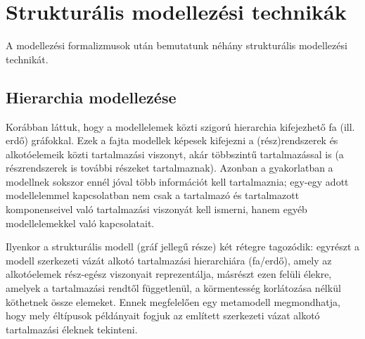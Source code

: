 
\section{Strukturális modellezési technikák}

%
%
%

A modellezési formalizmusok után bemutatunk néhány strukturális modellezési technikát.

\subsection{Hierarchia modellezése}

Korábban láttuk, hogy a modellelemek közti szigorú hierarchia kifejezhető fa (ill. erdő) gráfokkal. Ezek a fajta modellek képesek kifejezni a (rész)rendszerek és alkotóelemeik közti tartalmazási viszonyt, akár többszintű tartalmazással is (a részrendszerek is további részeket tartalmaznak). Azonban a gyakorlatban a modellnek sokszor ennél jóval több információt kell tartalmaznia; egy-egy adott modellelemmel kapcsolatban nem csak a tartalmazó és tartalmazott komponenseivel való tartalmazási viszonyát kell ismerni, hanem egyéb modellelemekkel való kapcsolatait.

Ilyenkor a strukturális modell (gráf jellegű része) két rétegre tagozódik: egyrészt a modell szerkezeti vázát alkotó tartalmazási hierarchiára (fa/erdő), amely az alkotóelemek rész-egész viszonyait reprezentálja, másrészt ezen felüli  élekre, amelyek a tartalmazási rendtől függetlenül, a körmentesség korlátozása nélkül köthetnek össze elemeket. Ennek megfelelően egy metamodell megmondhatja, hogy mely éltípusok példányait fogjuk az említett szerkezeti vázat alkotó tartalmazási éleknek tekinteni.

